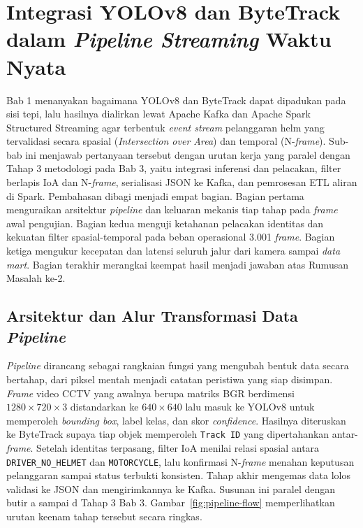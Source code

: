\section{Integrasi YOLOv8 dan ByteTrack dalam \textit{Pipeline Streaming} Waktu Nyata}
\label{sec:integrasi-pipeline}
Bab 1 menanyakan bagaimana YOLOv8 dan ByteTrack dapat dipadukan pada sisi tepi, lalu hasilnya dialirkan lewat Apache Kafka dan Apache Spark Structured Streaming agar terbentuk \textit{event stream} pelanggaran helm yang tervalidasi secara spasial (\textit{Intersection over Area}) dan temporal (N-\textit{frame}). Sub-bab ini menjawab pertanyaan tersebut dengan urutan kerja yang paralel dengan Tahap 3 metodologi pada Bab 3, yaitu integrasi inferensi dan pelacakan, filter berlapis IoA dan N-\textit{frame}, serialisasi JSON ke Kafka, dan pemrosesan ETL aliran di Spark. Pembahasan dibagi menjadi empat bagian. Bagian pertama menguraikan arsitektur \textit{pipeline} dan keluaran mekanis tiap tahap pada \textit{frame} awal pengujian. Bagian kedua menguji ketahanan pelacakan identitas dan kekuatan filter spasial-temporal pada beban operasional 3.001 \textit{frame}. Bagian ketiga mengukur kecepatan dan latensi seluruh jalur dari kamera sampai \textit{data mart}. Bagian terakhir merangkai keempat hasil menjadi jawaban atas Rumusan Masalah ke-2.

\subsection{Arsitektur dan Alur Transformasi Data \textit{Pipeline}}
\label{subsec:arsitektur-alur}

\textit{Pipeline} dirancang sebagai rangkaian fungsi yang mengubah bentuk data secara bertahap, dari piksel mentah menjadi catatan peristiwa yang siap disimpan. \textit{Frame} video CCTV yang awalnya berupa matriks BGR berdimensi $1280 \times 720 \times 3$ distandarkan ke $640 \times 640$ lalu masuk ke YOLOv8 untuk memperoleh \textit{bounding box}, label kelas, dan skor \textit{confidence}. Hasilnya diteruskan ke ByteTrack supaya tiap objek memperoleh \texttt{Track ID} yang dipertahankan antar-\textit{frame}. Setelah identitas terpasang, filter IoA menilai relasi spasial antara \texttt{DRIVER\_NO\_HELMET} dan \texttt{MOTORCYCLE}, lalu konfirmasi N-\textit{frame} menahan keputusan pelanggaran sampai status terbukti konsisten. Tahap akhir mengemas data lolos validasi ke JSON dan mengirimkannya ke Kafka. Susunan ini paralel dengan butir a sampai d Tahap 3 Bab 3. Gambar~\ref{fig:pipeline-flow} memperlihatkan urutan keenam tahap tersebut secara ringkas.

